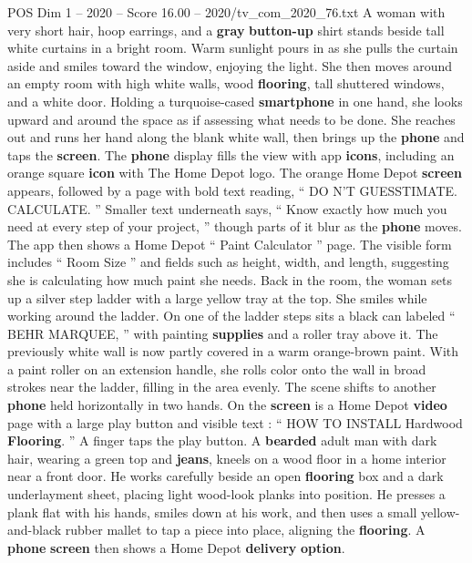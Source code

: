 \begin{textsample}{POS Dim 1 – 2020 – Score 16.00 – 2020/tv\_com\_2020\_76.txt}  \label{ex:f1_pos_012}
A woman with very short hair, hoop earrings, and a \textbf{gray} \textbf{button-up} shirt stands beside tall white curtains in a bright room.
Warm sunlight pours in as she pulls the curtain aside and smiles toward the window, enjoying the light.
She then moves around an empty room with high white walls, wood \textbf{flooring}, tall shuttered windows, and a white door.
Holding a turquoise-cased \textbf{smartphone} in one hand, she looks upward and around the space as if assessing what needs to be done.
She reaches out and runs her hand along the blank white wall, then brings up the \textbf{phone} and taps the \textbf{screen}.
The \textbf{phone} display fills the view with app \textbf{icons}, including an orange square \textbf{icon} with The Home Depot logo.
The orange Home Depot \textbf{screen} appears, followed by a page with bold text reading, “ DO N’T GUESSTIMATE.
CALCULATE. ” Smaller text underneath says, “ Know exactly how much you need at every step of your project, ” though parts of it blur as the \textbf{phone} moves.
The app then shows a Home Depot “ Paint Calculator ” page.
The visible form includes “ Room Size ” and fields such as height, width, and length, suggesting she is calculating how much paint she needs.
Back in the room, the woman sets up a silver step ladder with a large yellow tray at the top.
She smiles while working around the ladder.
On one of the ladder steps sits a black can labeled “ BEHR MARQUEE, ” with painting \textbf{supplies} and a roller tray above it.
The previously white wall is now partly covered in a warm orange-brown paint.
With a paint roller on an extension handle, she rolls color onto the wall in broad strokes near the ladder, filling in the area evenly.
The scene shifts to another \textbf{phone} held horizontally in two hands.
On the \textbf{screen} is a Home Depot \textbf{video} page with a large play button and visible text : “ HOW TO INSTALL Hardwood \textbf{Flooring}. ” A finger taps the play button.
A \textbf{bearded} adult man with dark hair, wearing a green top and \textbf{jeans}, kneels on a wood floor in a home interior near a front door.
He works carefully beside an open \textbf{flooring} box and a dark underlayment sheet, placing light wood-look planks into position.
He presses a plank flat with his hands, smiles down at his work, and then uses a small yellow-and-black rubber mallet to tap a piece into place, aligning the \textbf{flooring}.
A \textbf{phone} \textbf{screen} then shows a Home Depot \textbf{delivery} \textbf{option}.

\end{textsample}
